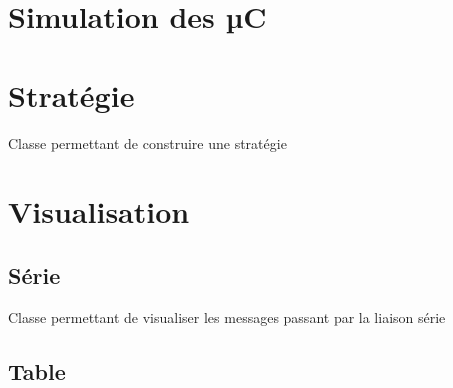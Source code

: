 \documentclass[letterpaper,10pt,french]{sphinxmanual}
\begin{document}
\chapter{Simulation des µC}
\label{simul_uc:module-lib.simul_uc}\label{simul_uc::doc}\label{simul_uc:simulation-des-c}

\chapter{Stratégie}
\label{strategie:module-lib.strategie}\label{strategie::doc}\label{strategie:strategie}

\begin{fulllineitems}
\label{strategie:lib.strategie.Strategie}
Classe permettant de construire une stratégie

\end{fulllineitems}



\chapter{Visualisation}
\label{visualisation::doc}\label{visualisation:visualisation}

\section{Série}
\label{visualisation:serie}\label{visualisation:module-lib.visualisation.visu_serie}

\begin{fulllineitems}
\label{visualisation:lib.visualisation.visu_serie.Visu_serie}
Classe permettant de visualiser les messages passant par la liaison série

\end{fulllineitems}



\section{Table}
\label{visualisation:table}\label{visualisation:module-lib.visualisation.visu_table}
\end{document}
